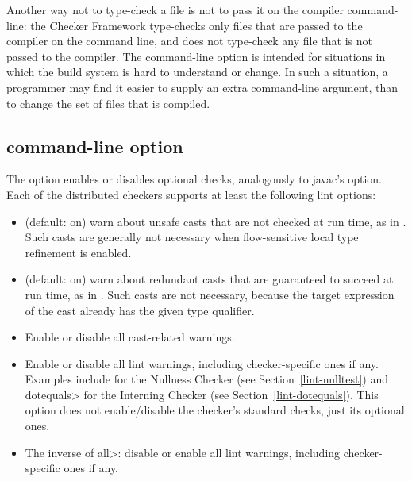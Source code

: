 Another way not to type-check a file is not to pass it on the compiler
command-line:  the Checker Framework type-checks only files that are passed
to the compiler on the command line, and does not type-check any file that
is not passed to the compiler.  The  command-line option
is intended for situations in which the build system is hard to understand
or change.  In such a situation, a programmer may find it easier to supply
an extra command-line argument, than to change the set of files that is
compiled.


\subsection{ command-line option\label{alint}}

\label{lint-options}

The  option enables or disables optional checks, analogously to
javac's  option.
Each of the distributed checkers supports at least the following lint options:

\begin{itemize}

\item
   (default: on) warn about unsafe casts that are not
  checked at run time, as in .  Such casts
  are generally not necessary when flow-sensitive local type refinement is
  enabled.

\item
   (default: on) warn about redundant
  casts that are guaranteed to succeed at run time,
  as in .  Such casts are not necessary,
  because the target expression of the cast already has the given type
  qualifier.

\item
   Enable or disable all cast-related warnings.

\item
   Enable or disable all lint warnings, including
  checker-specific ones if any.  Examples include  for the
  Nullness Checker (see Section~\ref{lint-nulltest}) and \<dotequals> for
  the Interning Checker (see Section~\ref{lint-dotequals}).  This option
  does not enable/disable the checker's standard checks, just its optional
  ones.

\item
   The inverse of \<all>:  disable or enable all lint warnings,
  including checker-specific ones if any.

\end{itemize}

